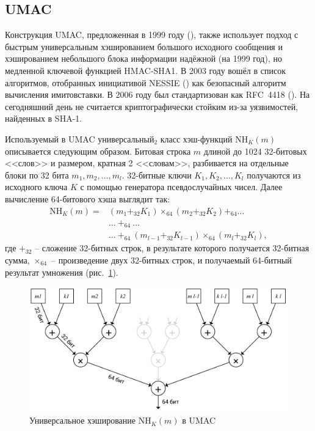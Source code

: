 \subsection{UMAC}\label{sec:umac}

Конструкция UMAC, предложенная в 1999 году (\cite{Black:Halevi:Krawczyk:etc:1999}), также использует подход с быстрым универсальным хэшированием большого исходного сообщения и хэшированием небольшого блока информации надёжной (на 1999 год), но медленной ключевой функцией HMAC-SHA1. В 2003 году вошёл в список алгоритмов, отобранных инициативой NESSIE () как безопасный алгоритм вычисления имитовставки. В 2006 году был стандартизован как RFC~4418 (\cite{rfc4418}). На сегодняшний день не считается криптографически стойким из-за уязвимостей, найденных в SHA-1.

Используемый в UMAC универсальный$_2$ класс хэш-функций $\textrm{NH}_K (m)$ описывается следующим образом. Битовая строка $m$ длиной до 1024 32-битовых <<слов>> и размером, кратная 2 <<словам>>, разбивается на отдельные блоки по 32 бита $m_1, m_2, \dots, m_l$. 32-битные ключи $K_1, K_2, \dots, K_l$ получаются из исходного ключа $K$ с помощью генератора псевдослучайных чисел. Далее вычисление 64-битового хэша выглядит так: \[\begin{array}{ll}
    \textrm{NH}_K (m) = & ( m_1 +_{32}K_1) \times_{64} (m_2 +_{32} K_2) +_{64} \dots \\
                        & \dots ~ +_{64} ~ \dots \\
                        & \dots ~ +_{64} ~ (m_{l-1} +_{32} K_{l-1}) \times_{64} (m_l+_{32}K_l),
\end{array} \] где $+_{32}$ -- сложение 32-битных строк, в результате которого получается 32-битная сумма, $\times_{64}$ -- произведение двух 32-битных строк, и получаемый 64-битный результат умножения (рис.~\ref{fig:UMAC}).

\begin{figure}
    \centering
    \includegraphics[width=1\textwidth]{pic/UMAC}
    \caption{Универсальное хэширование $\textrm{NH}_K (m)$ в UMAC}
    \label{fig:UMAC}
\end{figure}


